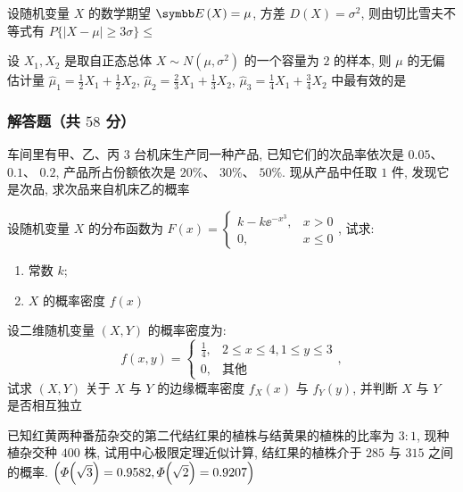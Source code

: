 \begin{ti}
	设随机变量 $X$ 的数学期望 $\EE(X)=\mu$, 方差 $D(X)=\sigma^2$, 则由切比雪夫不等式有 $P\{|X-\mu|\geq3\sigma\}\leq$ \hua{}
\end{ti}

\begin{ti}
	设 $X_1,X_2$ 是取自正态总体 $X\sim N\left(\mu,\sigma^2\right)$ 的一个容量为 $2$ 的样本, 则 $\mu$ 的无偏估计量 $\hat\mu_1=\frac{1}{2}X_1+\frac{1}{2}X_2$, $\hat\mu_2=\frac{2}{3}X_1+\frac{1}{3}X_2$, $\hat\mu_3=\frac{1}{4}X_1+\frac{3}{4}X_2$ 中最有效的是 \hua{}
\end{ti}

\subsubsection{解答题（共 $58$ 分）}
\begin{ti}[$10$ 分]
	车间里有甲、乙、丙 $3$ 台机床生产同一种产品, 已知它们的次品率依次是 $0.05$、 $0.1$、 $0.2$, 产品所占份额依次是 $20\%$、 $30\%$、 $50\%$. 现从产品中任取 $1$ 件, 发现它是次品, 求次品来自机床乙的概率
\end{ti}

\begin{ti}[$10$ 分]
	设随机变量 $X$ 的分布函数为 $F(x)=
	\begin{cases}
	k-k\ee^{-x^3}, & x>0\\
	0, & x\leq0
	\end{cases}
	$, 试求:
	\begin{enumerate}
		\item 常数 $k$;
		\item $X$ 的概率密度 $f(x)$
	\end{enumerate}
\end{ti}

\begin{ti}[$10$ 分]
	设二维随机变量 $(X,Y)$ 的概率密度为:
	\begin{equation*}
		f(x,y)=
		\begin{cases}
		\frac{1}{4}, & 2\leqslant x\leq4,1\leqslant y\leq3\\
		0, & \text{其他}
		\end{cases},
	\end{equation*}
	试求 $(X,Y)$ 关于 $X$ 与 $Y$ 的边缘概率密度 $f_X(x)$ 与 $f_Y(y)$, 并判断 $X$ 与 $Y$ 是否相互独立
\end{ti}

\begin{ti}[$10$ 分]
	已知红黄两种番茄杂交的第二代结红果的植株与结黄果的植株的比率为 $3:1$, 现种植杂交种 $400$ 株, 试用中心极限定理近似计算, 结红果的植株介于 $285$ 与 $315$ 之间的概率. $\Bigl(\varPhi\Bigl(\sqrt{3}\Bigr)=0.9582,\allowbreak\varPhi\Bigl(\sqrt{2}\Bigr)=0.9207\Bigr)$
\end{ti}

